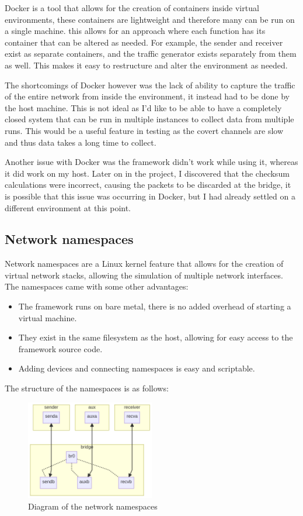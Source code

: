 Docker \citep{docker} is a tool that allows for the creation of containers inside virtual environments, these containers are lightweight and therefore many can be run on a single machine. this allows for an approach where each function has its container that can be altered as needed. For example, the sender and receiver exist as separate containers, and the traffic generator exists separately from them as well. This makes it easy to restructure and alter the environment as needed.

The shortcomings of Docker however was the lack of ability to capture the traffic of the entire network from inside the environment, it instead had to be done by the host machine. This is not ideal as I'd like to be able to have a completely closed system that can be run in multiple instances to collect data from multiple runs. This would be a useful feature in testing as the covert channels are slow and thus data takes a long time to collect.

Another issue with Docker was the framework didn't work while using it, whereas it did work on my host. Later on in the project, I discovered that the checksum calculations were incorrect, causing the packets to be discarded at the bridge, it is possible that this issue was occurring in Docker, but I had already settled on a different environment at this point.

\subsection{Network namespaces}

Network namespaces are a Linux kernel feature that allows for the creation of virtual network stacks, allowing the simulation of multiple network interfaces. The namespaces came with some other advantages:

\begin{itemize}
    \item The framework runs on bare metal, there is no added overhead of starting a virtual machine.
    \item They exist in the same filesystem as the host, allowing for easy access to the framework source code.
    \item Adding devices and connecting namespaces is easy and scriptable.
\end{itemize}

The structure of the namespaces is as follows:

\begin{figure}[H]
    \centering
    \includegraphics[width=0.5\textwidth]{fig/namespace_setup.png}
    \caption{Diagram of the network namespaces}
    \label{fig:namespace_diagram}
\end{figure}

